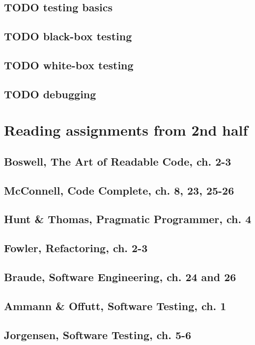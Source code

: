 \documentclass[11pt]{article}
\begin{document}
\subsection{{\bfseries\sffamily TODO} testing basics}
\label{sec-3-8}
\subsection{{\bfseries\sffamily TODO} black-box testing}
\label{sec-3-9}
\subsection{{\bfseries\sffamily TODO} white-box testing}
\label{sec-3-10}
\subsection{{\bfseries\sffamily TODO} debugging}
\label{sec-3-11}

\section{Reading assignments from 2nd half}
\label{sec-4}
\subsection{Boswell, The Art of Readable Code, ch. 2-3}
\label{sec-4-1}
\subsection{McConnell, Code Complete, ch. 8, 23, 25-26}
\label{sec-4-2}
\subsection{Hunt \& Thomas, Pragmatic Programmer, ch. 4}
\label{sec-4-3}
\subsection{Fowler, Refactoring, ch. 2-3}
\label{sec-4-4}
\subsection{Braude, Software Engineering, ch. 24 and 26}
\label{sec-4-5}
\subsection{Ammann \& Offutt, Software Testing, ch. 1}
\label{sec-4-6}
\subsection{Jorgensen, Software Testing, ch. 5-6}
\label{sec-4-7}
\end{document}
